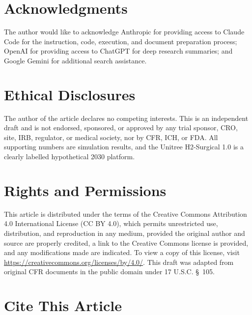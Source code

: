 
{}
\section*{Acknowledgments}
\label{sec:acknowledgments}

The author would like to acknowledge Anthropic for providing access to Claude
Code for the instruction, code, execution, and document preparation process;
OpenAI for providing access to ChatGPT for deep research summaries; and Google
Gemini for additional search assistance.

{}
\section*{Ethical Disclosures}
\label{sec:ethics}

The author of the article declares no competing interests. This is an independent
draft and is not endorsed, sponsored, or approved by any trial sponsor, CRO, site,
IRB, regulator, or medical society, nor by CFR, ICH, or FDA. All supporting
numbers are simulation results, and the Unitree H2-Surgical 1.0 is a clearly
labelled hypothetical 2030 platform.

{}
\section*{Rights and Permissions}
\label{sec:rights}

This article is distributed under the terms of the Creative Commons Attribution
4.0 International License (CC BY 4.0), which permits unrestricted use,
distribution, and reproduction in any medium, provided the original author and
source are properly credited, a link to the Creative Commons license is provided,
and any modifications made are indicated. To view a copy of this license, visit
\url{https://creativecommons.org/licenses/by/4.0/}. This draft was adapted from
original CFR documents in the public domain under 17 U.S.C. \S~105.

{}
\section*{Cite This Article}
\label{sec:cite}

